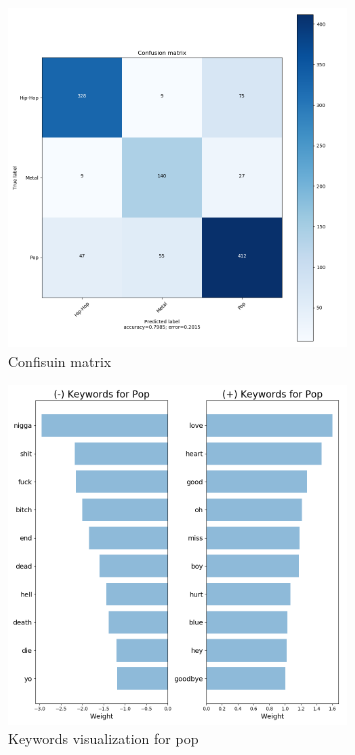 \documentclass[a4paper,11pt]{article}
\begin{document}
\begin{figure}[h]
\begin{center}
\includegraphics[width=0.8\textwidth]{./img/matrix.png}
\end{center}
\caption{Confisuin matrix}
\label{label-cf-matrix}
\end{figure}

\begin{figure}[h]
\begin{center}
\includegraphics[width=0.8\textwidth]{./img/pop-keywords.png}
\end{center}
\caption{Keywords visualization for pop}
\label{label-kw-pop}
\end{figure}
\end{document}
